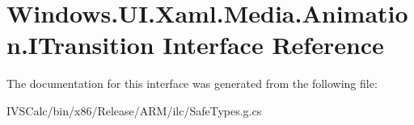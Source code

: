 \hypertarget{interface_windows_1_1_u_i_1_1_xaml_1_1_media_1_1_animation_1_1_i_transition}{}\section{Windows.\+U\+I.\+Xaml.\+Media.\+Animation.\+I\+Transition Interface Reference}
\label{interface_windows_1_1_u_i_1_1_xaml_1_1_media_1_1_animation_1_1_i_transition}


The documentation for this interface was generated from the following file\+:\begin{DoxyCompactItemize}
\item 
I\+V\+S\+Calc/bin/x86/\+Release/\+A\+R\+M/ilc/Safe\+Types.\+g.\+cs\end{DoxyCompactItemize}
